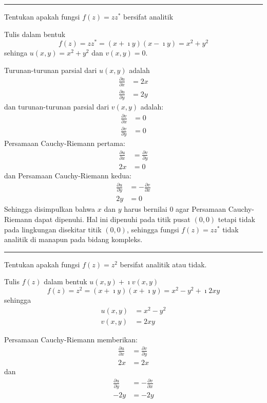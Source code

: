 \rule[0.5ex]{1\columnwidth}{1pt}

{\color{blue}
Tentukan apakah fungsi $f(z)=zz^{*}$ bersifat analitik
}

Tulis dalam bentuk
\begin{equation*}
f(z) = zz^{*} = (x + \imath y)(x - \imath y) = x^{2} + y^{2}
\end{equation*}
sehinga $u(x,y)=x^{2}+y^{2}$ dan $v(x,y)=0$.

Turunan-turunan parsial dari $u(x,y)$ adalah 
\begin{align*}
\frac{\partial u}{\partial x} & = 2x\\
\frac{\partial u}{\partial y} & = 2y
\end{align*}
dan turunan-turunan parsial dari $v(x,y)$ adalah:
\begin{align*}
\frac{\partial v}{\partial x} & =0\\
\frac{\partial v}{\partial y} & =0
\end{align*}
Persamaan Cauchy-Riemann pertama:
\begin{align*}
\frac{\partial u}{\partial x} & =\frac{\partial v}{\partial y} \\
2x & = 0
\end{align*}
%
dan Persamaan Cauchy-Riemann kedua:
\begin{align*}
\frac{\partial u}{\partial y} & =-\frac{\partial v}{\partial x} \\
2y & =0
\end{align*}
Sehingga disimpulkan bahwa $x$ dan $y$ harus bernilai 0 agar Persamaan
Cauchy-Riemann dapat dipenuhi. Hal ini dipenuhi pada titik pusat $(0,0)$
tetapi tidak pada lingkungan disekitar titik $(0,0)$, sehingga fungsi
$f(z)=zz^{*}$ tidak analitik di manapun pada bidang kompleks.

\rule[0.5ex]{1\columnwidth}{1pt}

{\color{blue}
Tentukan apakah fungsi $f(z)=z^{2}$ bersifat analitik atau tidak.
}

Tulis $f(z)$ dalam bentuk $u(x,y) + \imath v(x,y)$ 
\begin{equation*}
f(z) = z^{2} = (x+\imath y)(x+\imath y) = x^{2} - y^{2} + \imath 2xy
\end{equation*}
sehingga
\begin{align*}
u(x,y) & = x^{2} - y^{2} \\
v(x,y) & = 2xy
\end{align*}


Persamaan Cauchy-Riemann memberikan:
\begin{align*}
\frac{\partial u}{\partial x} & =\frac{\partial v}{\partial y} \\
2x & = 2x
\end{align*}
dan
\begin{align*}
\frac{\partial u}{\partial y} & = -\frac{\partial v}{\partial x} \\
-2y & =-2y
\end{align*}

